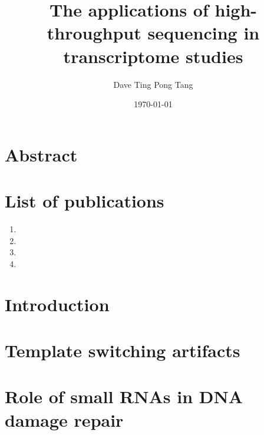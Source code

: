 \documentclass[10pt,a4paper]{report}
\begin{document}
%

\title{
   {The applications of high-throughput sequencing in transcriptome studies}
}

\author{Dave Ting Pong Tang}
\date{\today}
\maketitle

%

\chapter*{Abstract}


\chapter*{List of publications}

\begin{enumerate}
\item {}
\item {}
\item {}
\item {}
\end{enumerate}

\tableofcontents

\listoffigures



\chapter{Introduction}\label{intro}


\chapter{Template switching artifacts}\label{template_switching}



\chapter{Role of small RNAs in DNA damage repair}\label{ddrna}


\end{document}
